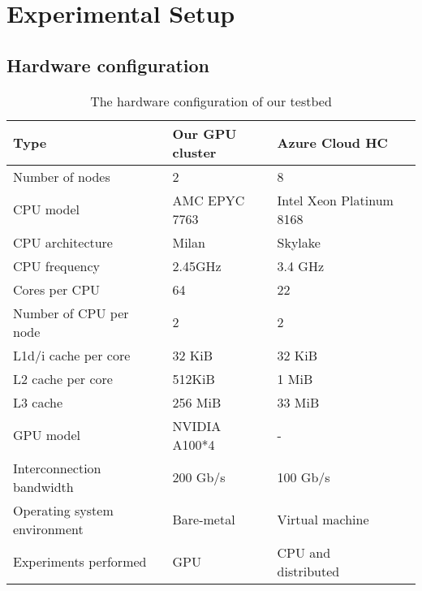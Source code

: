 \section{Experimental Setup}
\label{sec:exp-setup}

\subsection{Hardware configuration}
\begin{table}[t]
    \centering
    \caption{The hardware configuration of our testbed}
    \begin{adjustbox}{width=248pt}
    \begin{tabular}{l|lll}
    \toprule
    Type                      &  Our GPU cluster        & Azure Cloud HC           \\
    \midrule
    Number of nodes          & 2                        & 8                       \\
    CPU model                 & AMC EPYC 7763           & Intel Xeon Platinum 8168 \\
    CPU architecture          & Milan                  & Skylake                  \\
    CPU frequency             & 2.45GHz                 & 3.4 GHz                  \\
    Cores per CPU             & 64                      & 22                       \\
    Number of CPU per node    & 2                       & 2                        \\
    L1d/i cache per core      & 32 KiB                  & 32 KiB                   \\
    L2 cache per core         & 512KiB                  & 1 MiB                    \\
    L3 cache              & 256 MiB                & 33 MiB                   \\
    GPU model                 & NVIDIA A100*4           & -                        \\
    Interconnection bandwidth & 200 Gb/s                & 100 Gb/s                 \\
    \midrule
    Operating system environment & Bare-metal & Virtual machine\\
    \midrule
    Experiments performed     & GPU                     & CPU and distributed \\
    \bottomrule
    \end{tabular}
    \end{adjustbox}
    \label{table:hardware}
\end{table}

